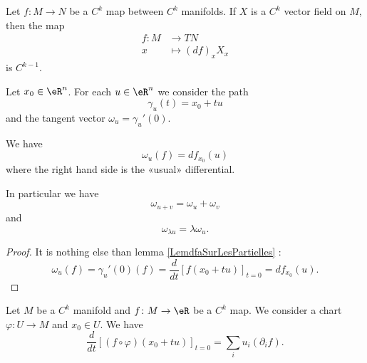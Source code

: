 \begin{proposition}		\label{PROPooNTSLooCXQQXy}
	Let \(f \colon M\to N  \) be a \( C^k\) map between \( C^k\) manifolds. If \( X\) is a \( C^k\) vector field on \( M\), then the map
	\begin{equation}
		\begin{aligned}
			f\colon M & \to TN            \\
			x         & \mapsto (df)_xX_x
		\end{aligned}
	\end{equation}
	is \( C^{k-1}\).
\end{proposition}


\begin{proposition}	\label{PROPooAPLXooZWqXkv}
	Let \( x_0\in \eR^n\). For each \( u\in \eR^n\) we consider the path
	\begin{equation}
		\gamma_u(t)=x_0+tu
	\end{equation}
	and the tangent vector \( \omega_u=\gamma_u'(0)\).

	We have
	\begin{equation}
		\omega_u(f)=df_{x_0}(u)
	\end{equation}
	where the right hand side is the «usual» differential.

	In particular we have
	\begin{equation}
		\omega_{u+v}=\omega_u+\omega_v
	\end{equation}
	and
	\begin{equation}
		\omega_{\lambda u}=\lambda\omega_u.
	\end{equation}
\end{proposition}

\begin{proof}
	It is nothing else than lemma \ref{LemdfaSurLesPartielles} :
	\begin{equation}
		\omega_u(f)=\gamma_u'(0)(f)=\frac{d}{dt} \left[ f(x_0+tu)  \right]_{t=0}=df_{x_0}(u).
	\end{equation}
\end{proof}

\begin{proposition}	\label{PROPooHSXOooMFuJdH}
	Let \( M\) be a \( C^k\) manifold and \(f \colon M\to \eR  \) be a \( C^k\) map. We consider a chart \(\varphi \colon U\to M  \) and \( x_0\in U\). We have
	\begin{equation}
		\frac{d}{dt} \left[ (f\circ\varphi)(x_0+tu)  \right]_{t=0}=\sum_iu_i(\partial_if).
	\end{equation}
\end{proposition}

